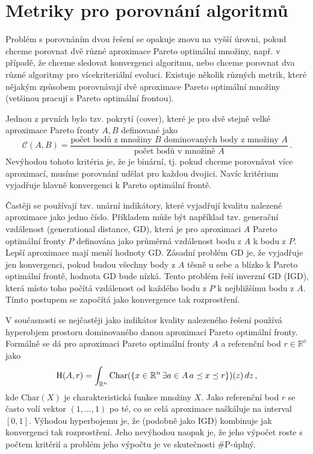\section{Metriky pro porovnání algoritmů}

Problém s porovnáním dvou řešení se opakuje znovu na vyšší úrovni, pokud chceme porovnat dvě různé aproximace Pareto optimální množiny, např. v případě, že chceme sledovat konvergenci algoritmu, nebo chceme porovnat dva různé algoritmy pro vícekriteriální evoluci. Existuje několik různých metrik, které nějakým způsobem porovnávají dvě aproximace Pareto optimální množiny (vetšinou pracují s Pareto optimální frontou). 

Jednou z prvních bylo tzv. pokrytí (cover), které je pro dvě stejně velké aproximace Pareto fronty $A, B$ definované jako 
$$\mathcal{C}(A, B) = \frac{\text{počet bodů z množiny $B$ dominovaných body z množiny $A$}}{\text{počet bodů v množině $A$}}\,.$$
Nevýhodou tohoto kritéria je, že je binární, tj. pokud chceme porovnávat více aproximací, musíme porovnání udělat pro každou dvojici. Navíc kritérium vyjadřuje hlavně konvergenci k Pareto optimální frontě.

Častěji se používají tzv. unární indikátory, které vyjadřují kvalitu nalezené aproximace jako jedno číslo. Příkladem může být například tzv. generační vzdálenost (generational distance, GD), která je pro aproximaci $A$ Pareto optimální fronty $P$ definována jako průměrná vzdálenost bodu z $A$ k bodu z $P$. Lepší aproximace mají menší hodnoty GD. Zásadní problém GD je, že vyjadřuje jen konvergenci, pokud budou všechny body z $A$ těsně u sebe a blízko k Pareto optimální frontě, hodnota GD bude nízká. Tento problém řeší inverzní GD (IGD), která místo toho počítá vzdálenost od každého bodu z $P$ k nejbližšímu bodu z $A$. Tímto postupem se započítá jako konvergence tak rozprostření.

V současnosti se nejčastěji jako indikátor kvality nalezeného řešení používá hyperobjem prostoru dominovaného danou aproximací Pareto optimální fronty. Formálně se dá pro aproximaci Pareto optimální fronty $A$ a referenční bod $r\in \mathbb{R^n}$ jako 
$$
\mathrm{H}(A,r)=\int_{{\mathbb{R}}^n}\mathrm{Char}(\{x\in {\ensuremath{\mathbb{R}}}^n\,\exists a\in A\, a\preceq x\preceq r\})(z)\, dz\,,
$$
kde $\mathrm{Char}(X)$ je charakteristická funkce množiny $X$. Jako referenční bod $r$ se často volí vektor $(1, \dots, 1)$ po té, co se celá aproximace naškáluje na interval $[0,1]$. Výhodou hyperbojemu je, že (podobně jako IGD) kombinuje jak konvergenci tak rozprostření. Jeho nevýhodou naopak je, že jeho výpočet roste s počtem kritérií a problém jeho výpočtu je ve skutečnosti $\#\mathrm{P}$-úplný.

